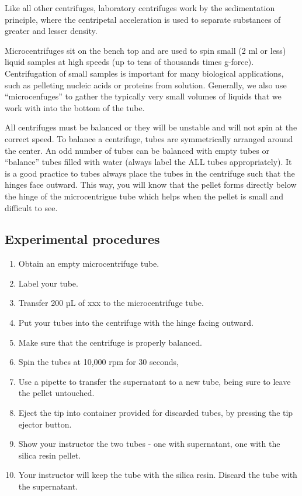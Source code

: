 \documentclass[]{book}
\providecommand{\tightlist}{%
  \setlength{\itemsep}{0pt}\setlength{\parskip}{0pt}}
\theoremstyle{definition}
\theoremstyle{definition}
\theoremstyle{definition}
\theoremstyle{remark}
\begin{document}
Like all other centrifuges, laboratory centrifuges work by the
sedimentation principle, where the centripetal acceleration is used to
separate substances of greater and lesser density.

Microcentrifuges sit on the bench top and are used to spin small (2 ml
or less) liquid samples at high speeds (up to tens of thousands times
g-force). Centrifugation of small samples is important for many
biological applications, such as pelleting nucleic acids or proteins
from solution. Generally, we also use ``microcenfuges'' to gather the
typically very small volumes of liquids that we work with into the
bottom of the tube.

All centrifuges must be balanced or they will be unstable and will not
spin at the correct speed. To balance a centrifuge, tubes are
symmetrically arranged around the center. An odd number of tubes can be
balanced with empty tubes or ``balance'' tubes filled with water (always
label the ALL tubes appropriately). It is a good practice to tubes
always place the tubes in the centrifuge such that the hinges face
outward. This way, you will know that the pellet forms directly below
the hinge of the microcentrigue tube which helps when the pellet is
small and difficult to see.

\subsection{Experimental procedures}\label{experimental-procedures-7}

\begin{enumerate}
\def\labelenumi{\arabic{enumi}.}
\tightlist
\item
  Obtain an empty microcentrifuge tube.
\item
  Label your tube.
\item
  Transfer 200 µL of xxx to the microcentrifuge tube.
\item
  Put your tubes into the centrifuge with the hinge facing outward.
\item
  Make sure that the centrifuge is properly balanced.
\item
  Spin the tubes at 10,000 rpm for 30 seconds,
\item
  Use a pipette to transfer the supernatant to a new tube, being sure to
  leave the pellet untouched.
\item
  Eject the tip into container provided for discarded tubes, by pressing
  the tip ejector button.
\item
  Show your instructor the two tubes - one with supernatant, one with
  the silica resin pellet.
\item
  Your instructor will keep the tube with the silica resin. Discard the
  tube with the supernatant.
\end{enumerate}
\end{document}
